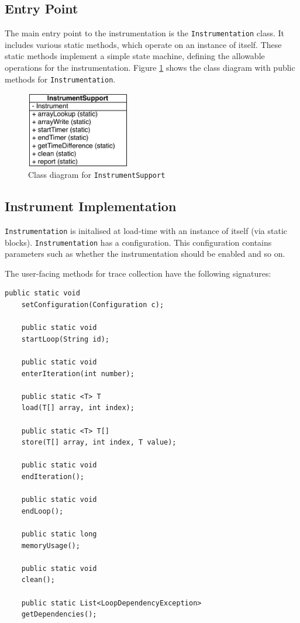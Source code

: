 	\subsection{Entry Point} \label{sec:runtime/implementation/entry-point}
	The main entry point to the instrumentation is the \texttt{Instrumentation} class. It includes various static methods, which operate on an instance of itself. These static methods implement a simple state machine, defining the allowable operations for the instrumentation. Figure \ref{fig:instrument-support} shows the class diagram with public methods for \texttt{Instrumentation}.
	
	\begin{figure}
		\centering
		\includegraphics[width=0.4\textwidth]{graphics/instrument-support.pdf}
		\caption{Class diagram for \texttt{InstrumentSupport}}
		\label{fig:instrument-support}
	\end{figure}
	
	\subsection{Instrument Implementation} \label{sec:runtime/implementation/instrument}
	\texttt{Instrumentation} is initalised at load-time with an instance of itself (via static blocks). \texttt{Instrumentation} has a configuration. This configuration contains parameters such as whether the instrumentation should be enabled and so on.
	
	The user-facing methods for trace collection have the following signatures:
	
	\begin{lstlisting}[caption=Method signatures for instrumentation methods,label=lst:sigs]
	public static void
	setConfiguration(Configuration c);
	
	public static void
	startLoop(String id);
	
	public static void
	enterIteration(int number);
	
	public static <T> T
	load(T[] array, int index);
	
	public static <T> T[]
	store(T[] array, int index, T value);
	
	public static void
	endIteration();
	
	public static void
	endLoop();
	
	public static long
	memoryUsage();
	
	public static void
	clean();
	
	public static List<LoopDependencyException>
	getDependencies();\end{lstlisting}
	
